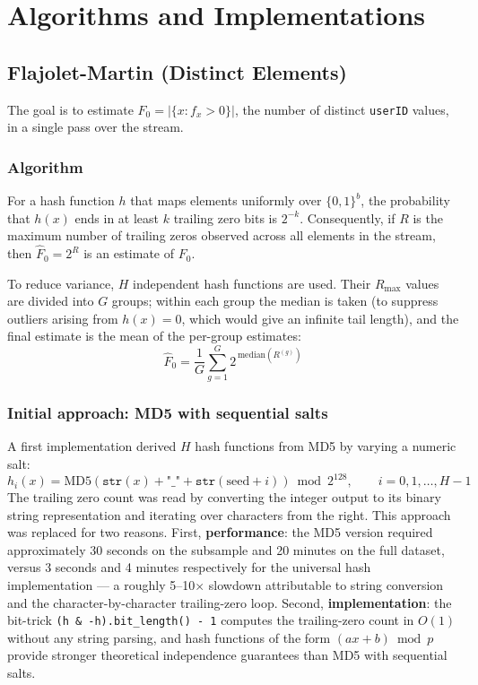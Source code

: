 \documentclass[11pt,a4paper]{article}
\begin{document}
\section{Algorithms and Implementations}

\subsection{Flajolet-Martin (Distinct Elements)}

The goal is to estimate $F_0 = |\{x : f_x > 0\}|$, the number of distinct
\texttt{userID} values, in a single pass over the stream.

\subsubsection*{Algorithm}
For a hash function $h$ that maps elements uniformly over $\{0,1\}^b$, the probability
that $h(x)$ ends in at least $k$ trailing zero bits is $2^{-k}$. Consequently, if $R$
is the maximum number of trailing zeros observed across all elements in the stream,
then $\hat{F}_0 = 2^R$ is an estimate of $F_0$.

To reduce variance, $H$ independent hash functions are used.
Their $R_{\max}$ values are divided into $G$ groups; within each group the median is
taken (to suppress outliers arising from $h(x)=0$, which would give an infinite tail
length), and the final estimate is the mean of the per-group estimates:
\[
  \hat{F}_0 = \frac{1}{G}\sum_{g=1}^{G} 2^{\,\mathrm{median}(R^{(g)})}
\]

\subsubsection*{Initial approach: MD5 with sequential salts}

A first implementation derived $H$ hash functions from MD5 by varying a numeric salt:
\[
  h_i(x) = \mathrm{MD5}\!\left(\texttt{str}(x) + \texttt{"\_"} + \texttt{str}(\mathrm{seed}+i)\right)
  \bmod 2^{128}, \qquad i = 0, 1, \ldots, H-1
\]
The trailing zero count was read by converting the integer output to its binary
string representation and iterating over characters from the right.
This approach was replaced for two reasons.
First, \textbf{performance}: the MD5 version required approximately 30 seconds on
the subsample and 20 minutes on the full dataset, versus 3 seconds and 4 minutes
respectively for the universal hash implementation — a roughly 5--10$\times$ slowdown
attributable to string conversion and the character-by-character trailing-zero loop.
Second, \textbf{implementation}: the bit-trick \texttt{(h \& -h).bit\_length() - 1}
computes the trailing-zero count in $O(1)$ without any string parsing, and
hash functions of the form $(ax+b) \bmod p$ provide stronger theoretical
independence guarantees than MD5 with sequential salts.
\end{document}
